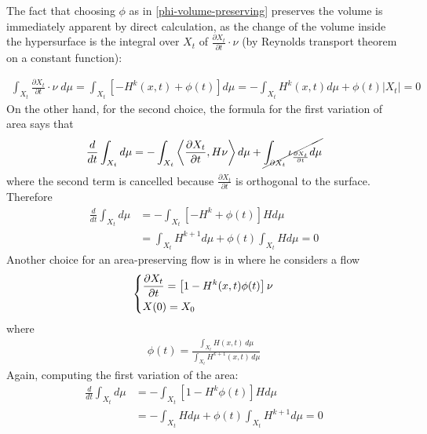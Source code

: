 The fact that choosing $\phi$ as in \ref{phi-volume-preserving} preserves the volume is immediately apparent by direct calculation, as the change of the volume inside the hypersurface is the integral over $X_t$ of $\frac{\partial X_t}{\partial t}\cdot \nu$ (by Reynolds transport theorem on a constant function): 

\begin{align*}
		\int_{X_t}\frac{\partial X_t}{\partial t}\cdot \nu \;d\mu= \int_{X_t} \left[- H^k(x, t) + \phi(t)\right] d\mu = - \int_{X_t}  H^k(x, t) d\mu + \phi(t)|X_t|=0
\end{align*}
On the other hand, for the second choice, the formula for the first variation of area says that 
\begin{align*}
	\frac{d}{d t}\int_{X_t} d\mu = -  \int_{X_t} \left\langle\frac{\partial X_t}{\partial t} , H \nu \right\rangle d\mu  +\cancel{\int_{\partial X_t}\iota_{\frac{\partial X_t}{\partial t}}  d\mu}
\end{align*}
where the second term is cancelled because $\frac{\partial X_t}{\partial t}$ is orthogonal to the surface. Therefore
\begin{align*}
	\frac{d}{d t}\int_{X_t} d\mu &= -  \int_{X_t}  \left[- H^k + \phi(t)\right] H d\mu \\
	&=  \int_{X_t}  H^{k+1} d\mu  + \phi(t)\int_{X_t} H d\mu = 0
\end{align*}
Another choice for an area-preserving flow is in \cite{mccoy} where he considers a flow 
\begin{align}
	\begin{dcases}
		\frac{\partial X_t}{\partial t} = \left[1 - H^k(x, t)  \phi(t)\right] \nu\\
		X(0)= X_0
	\end{dcases} \label{mccoy equation}
\end{align}
where 
\begin{align*}
	\phi(t) = \frac{\int_{X_t} H(x, t) \, d\mu}{\int_{X_t} H^{k+1}(x, t) \, d\mu}
\end{align*}
Again, computing the first variation of the area:
\begin{align*}
	\frac{d}{d t}\int_{X_t} d\mu &= -  \int_{X_t}  \left[1 - H^k\phi(t)\right] H d\mu \\
	&= - \int_{X_t}  H d\mu  + \phi(t)\int_{X_t} H^{k+1} d\mu = 0
\end{align*}
